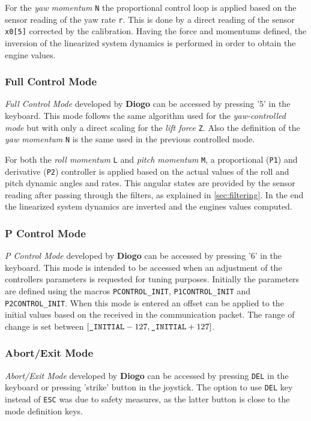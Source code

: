 \documentclass{article}
\begin{document}
For the \textit{yaw momentum} \texttt{N} the proportional control loop is applied based on the sensor reading of the yaw rate \texttt{r}. This is done by a direct reading of the sensor \texttt{x0[5]} corrected by the calibration. Having the force and momentums defined, the inversion of the linearized system dynamics is performed in order to obtain the engine values. 

\subsubsection{Full Control Mode}
\textit{Full Control Mode} developed by \textbf{Diogo} can be accessed by pressing '$5$' in the keyboard. This mode follows the same algorithm used for the \textit{yaw-controlled mode} but with only a direct scaling for the \textit{lift force} \texttt{Z}. Also the definition of the \textit{yaw momentum} \texttt{N} is the same used in the previous controlled mode. 

For both the \textit{roll momentum} \texttt{L} and \textit{pitch momentum} \texttt{M}, a proportional (\texttt{P1}) and derivative (\texttt{P2}) controller is applied based on the actual values of the roll and pitch dynamic angles and rates. This angular states are provided by the sensor reading after passing through the filters, as explained in \ref{sec:filtering}. In the end the linearized system dynamics are inverted and the engines values computed.

\subsubsection{P Control Mode}
\textit{P Control Mode} developed by \textbf{Diogo} can be accessed by pressing '$6$' in the keyboard. This mode is intended to be accessed when an adjustment of the controllers parameters is requested for tuning purposes. Initially the parameters are defined using the macros \texttt{PCONTROL\_INIT}, \texttt{P1CONTROL\_INIT} and \texttt{P2CONTROL\_INIT}. When this mode is entered an offset can be applied to the initial values based on the received in the communication packet. The range of change is set between $[\text{\texttt{\_INITIAL}}-127,\text{\texttt{\_INITIAL}}+127]$.

\subsubsection{Abort/Exit Mode}
\textit{Abort/Exit Mode} developed by \textbf{Diogo} can be accessed by pressing \texttt{DEL} in the keyboard or pressing 'strike' button in the joystick. The option to use \texttt{DEL} key instead of \texttt{ESC} was due to safety measures, as the latter button is close to the mode definition keys. 
\end{document}
